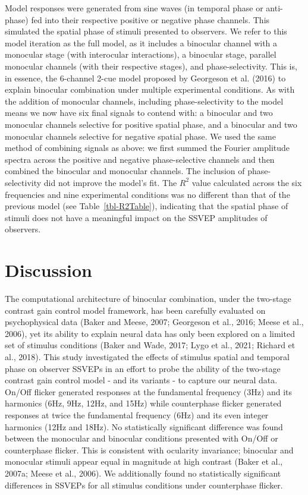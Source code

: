 \documentclass[
  12pt,
]{article}
\begin{document}
Model responses were generated from sine waves (in temporal phase or
anti-phase) fed into their respective positive or negative phase
channels. This simulated the spatial phase of stimuli presented to
observers. We refer to this model iteration as the full model, as it
includes a binocular channel with a monocular stage (with interocular
interactions), a binocular stage, parallel monocular channels (with
their respective stages), and phase-selectivity. This is, in essence,
the 6-channel 2-cue model proposed by Georgeson et al. (2016) to explain
binocular combination under multiple experimental conditions. As with
the addition of monocular channels, including phase-selectivity to the
model means we now have six final signals to contend with: a binocular
and two monocular channels selective for positive spatial phase, and a
binocular and two monocular channels selective for negative spatial
phase. We used the same method of combining signals as above: we first
summed the Fourier amplitude spectra across the positive and negative
phase-selective channels and then combined the binocular and monocular
channels. The inclusion of phase-selectivity did not improve the model's
fit. The \(R^2\) value calculated across the six frequencies and nine
experimental conditions was no different than that of the previous model
(see Table~\ref{tbl-R2Table}), indicating that the spatial phase of
stimuli does not have a meaningful impact on the SSVEP amplitudes of
observers.

\section{Discussion}\label{discussion}

The computational architecture of binocular combination, under the
two-stage contrast gain control model framework, has been carefully
evaluated on psychophysical data (Baker and Meese, 2007; Georgeson et
al., 2016; Meese et al., 2006), yet its ability to explain neural data
has only been explored on a limited set of stimulus conditions (Baker
and Wade, 2017; Lygo et al., 2021; Richard et al., 2018). This study
investigated the effects of stimulus spatial and temporal phase on
observer SSVEPs in an effort to probe the ability of the two-stage
contrast gain control model - and its variants - to capture our neural
data. On/Off flicker generated responses at the fundamental frequency
(3Hz) and its harmonics (6Hz, 9Hz, 12Hz, and 15Hz) while counterphase
flicker generated responses at twice the fundamental frequency (6Hz) and
its even integer harmonics (12Hz and 18Hz). No statistically significant
difference was found between the monocular and binocular conditions
presented with On/Off or counterphase flicker. This is consistent with
ocularity invariance; binocular and monocular stimuli appear equal in
magnitude at high contrast (Baker et al., 2007a; Meese et al., 2006). We
additionally found no statistically significant differences in SSVEPs
for all stimulus conditions under counterphase flicker.
\end{document}
